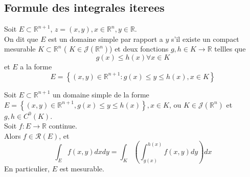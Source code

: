 \documentclass[../main.tex]{subfiles}
\begin{document}
\subsection{Formule des integrales iterees}
\begin{defn}
	Soit $E \subset \mathbb{R}^{n+1}$, $z = ( x,y) , x \in \mathbb{R}^n, y \in \mathbb{R}$.\\
	On dit que $E$ est un domaine simple par rapport a $y$ s'il existe un compact mesurable  $K \subset \mathbb{R}^n$ (  $K \in \mathcal{J}( \mathbb{R}^n) $) et deux fonctions $g,h \in K \to \mathbb{R}$ tellles que
	\[ 
		g( x) \leq h( x) \forall x \in K
	\]
	et $E$ a la forme 
\[ 
	E = \left\{ ( x,y) \in \mathbb{R}^{n+1}: g( x) \leq  y \leq  h( x) , x \in K \right\} 
\]

\end{defn}
\begin{thm}
	Soit $E \subset \mathbb{R}^{n+1}$ un domaine simple de la forme $E = \left\{ ( x,y) \in \mathbb{R}^{n+1}, g( x) \leq  y \leq  h( x)  \right\} , x \in K$, ou $K \in \mathcal{J}( \mathbb{R}^n) $ et $g,h \in C^{0}( K) $.\\
	Soit $f: E \to \mathbb{R}$ continue.\\
	Alors $f\in \mathcal{R}( E) $, et 
	\[ 
		\int_E f( x,y) dx dy = \int_K \left( \int_{ g( x)  }^{ h( x)  }f( x,y) dy \right) dx
	\]
	En particulier, $E$ est mesurable.
\end{thm}
\end{document}
